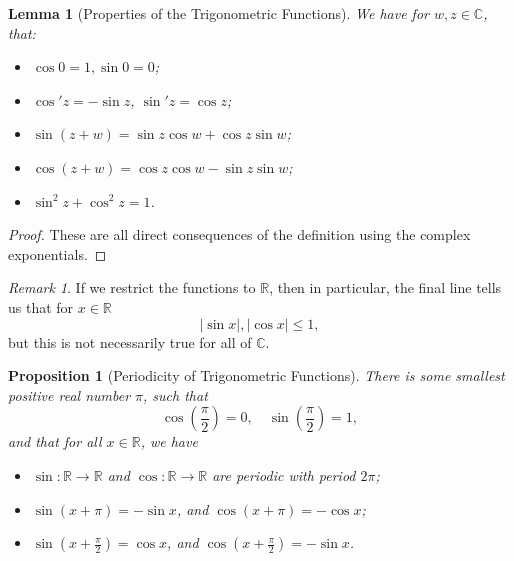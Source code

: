 \documentclass[11pt]{article}
\numberwithin{equation}{section}
\newtheorem{lemma}[theorem]{Lemma}
\newtheorem{proposition}[theorem]{Proposition}
\theoremstyle{definition}
\theoremstyle{remark}
\newtheorem{remark}[theorem]{Remark}
\newcommand{\pqty}[1]{\left(#1\right)}
\newcommand{\abs}[1]{\left|#1\right|}
\newcommand{\functiondomain}[3]{#1:#2\to #3}
\newcommand{\RR}{\mathbb R}
\newcommand{\CC}{\mathbb C}
\begin{document}
\begin{lemma}[Properties of the Trigonometric Functions]\label{analysis-unit-0230}
    \label{lem:properties-trigonometric-functions}%
    We have for \(w, z \in \CC\), that:
    \begin{itemize}
        \item \(\cos 0 = 1, \sin 0 = 0\);
        \item \(\cos' z = - \sin z\), \(\sin' z = \cos z\);
        \item \(\sin \pqty{z + w} = \sin z \cos w + \cos z \sin w\);
        \item \(\cos \pqty{z + w} = \cos z \cos w - \sin z \sin w\);
        \item \(\sin^2 z + \cos^2 z = 1\).
    \end{itemize}
\end{lemma}

\begin{proof}
    These are all direct consequences of the definition using the complex exponentials.
\end{proof}

\begin{remark}\label{analysis-unit-0231}
    If we restrict the functions to \(\RR\), then in particular, the final line tells us that for \(x \in \RR\)
    \[
        \abs{\sin x}, \abs{\cos x} \leq 1,
    \]
    but this is not necessarily true for all of \(\CC\).
\end{remark}

\begin{proposition}[Periodicity of Trigonometric Functions]\label{analysis-unit-0232}
    \label{prop:periodicity-trigonometric-functions}%
    There is some smallest positive real number \(\pi\), such that
    \[
        \cos \pqty{\frac{\pi}{2}} = 0, \quad \sin \pqty{\frac{\pi}{2}} = 1,
    \]
    and that for all \(x \in \RR\), we have
    \begin{itemize}
        \item \(\functiondomain{\sin}{\RR}{\RR}\) and \(\functiondomain{\cos}{\RR}{\RR}\) are periodic with period \(2 \pi\);
        \item \(\sin \pqty{x + \pi} = - \sin x\), and \(\cos \pqty{x + \pi} = - \cos x\);
        \item \(\sin \pqty{x + \frac{\pi}{2}} = \cos x\), and \(\cos \pqty{x + \frac{\pi}{2}} = - \sin x\).
    \end{itemize}
\end{proposition}
\end{document}
